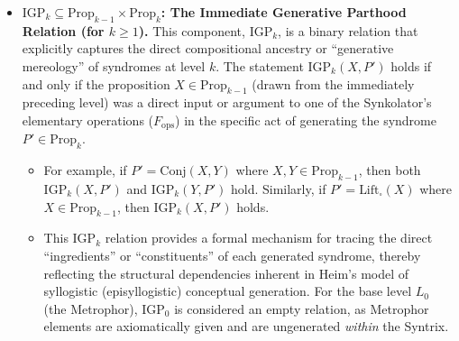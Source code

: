 \documentclass[
    12pt,              %
    a4paper,           %
    headings=normal,   %
    twoside=true,      %
    BCOR=8mm,          %
]{scrbook}
\newcommand{\q}[1]{\enquote{#1}}
\newcommand{\BoxSyn}{\square}
\newcommand{\fops}{F_{\text{ops}}}
\begin{document}
\begin{itemize}
    \item   \textbf{\(\text{IGP}_k \subseteq \text{Prop}_{k-1} \times \text{Prop}_k\): The Immediate Generative Parthood Relation (for \(k \ge 1\)).}
        This component, \(\text{IGP}_k\), is a binary relation that explicitly captures the direct compositional ancestry or \q{generative mereology} of syndromes at level \(k\). The statement \(\text{IGP}_k(X, P')\) holds if and only if the proposition \(X \in \text{Prop}_{k-1}\) (drawn from the immediately preceding level) was a direct input or argument to one of the Synkolator's elementary operations (\(\fops\)) in the specific act of generating the syndrome \(P' \in \text{Prop}_k\).
        \begin{itemize}
            \item   For example, if \(P' = \text{Conj}(X, Y)\) where \(X, Y \in \text{Prop}_{k-1}\), then both \(\text{IGP}_k(X, P')\) and \(\text{IGP}_k(Y, P')\) hold. Similarly, if \(P' = \text{Lift}_\BoxSyn(X)\) where \(X \in \text{Prop}_{k-1}\), then \(\text{IGP}_k(X, P')\) holds.
            \item   This \(\text{IGP}_k\) relation provides a formal mechanism for tracing the direct \q{ingredients} or \q{constituents} of each generated syndrome, thereby reflecting the structural dependencies inherent in Heim's model of syllogistic (episyllogistic) conceptual generation. For the base level \(L_0\) (the Metrophor), \(\text{IGP}_0\) is considered an empty relation, as Metrophor elements are axiomatically given and are ungenerated \textit{within} the Syntrix.
        \end{itemize}


\end{itemize}
\end{document}
